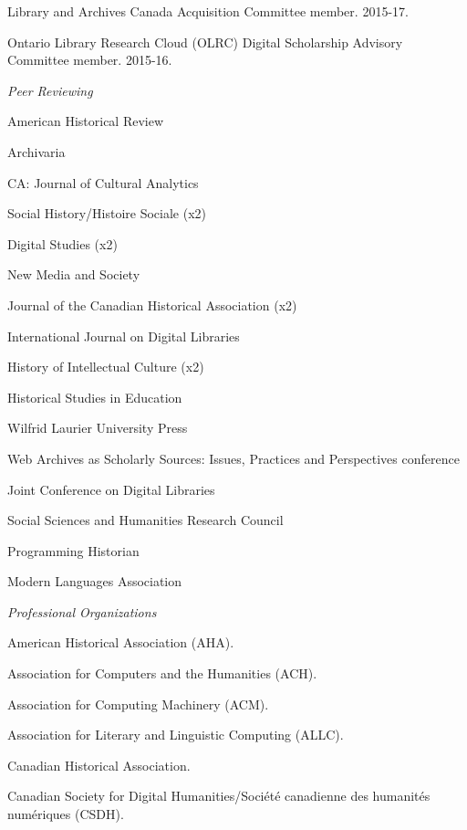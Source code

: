 \documentclass[11pt,article,oneside]{memoir}
\begin{document}
\ind Library and Archives Canada Acquisition Committee member. 2015-17.

\ind Ontario Library Research Cloud (OLRC) Digital Scholarship Advisory Committee member. 2015-16.

\medskip

\noindent\emph{Peer Reviewing \vspace{0.05in}}

\ind American Historical Review

\ind Archivaria

\ind CA: Journal of Cultural Analytics

\ind Social History/Histoire Sociale (x2)

\ind Digital Studies (x2)

\ind New Media and Society

\ind Journal of the Canadian Historical Association (x2)

\ind International Journal on Digital Libraries

\ind History of Intellectual Culture (x2)

\ind Historical Studies in Education

\ind Wilfrid Laurier University Press

\ind Web Archives as Scholarly Sources: Issues, Practices and Perspectives conference

\ind Joint Conference on Digital Libraries

\ind Social Sciences and Humanities Research Council

\ind Programming Historian

\ind Modern Languages Association

\medskip

\noindent\emph{Professional Organizations \vspace{0.05in}}

\ind American Historical Association (AHA).

\ind Association for Computers and the Humanities (ACH).

\ind Association for Computing Machinery (ACM).

\ind Association for Literary and Linguistic Computing (ALLC).

\ind Canadian Historical Association.

\ind Canadian Society for Digital Humanities/Soci\'et\'e canadienne des humanit\'es num\'eriques (CSDH).
\end{document}
